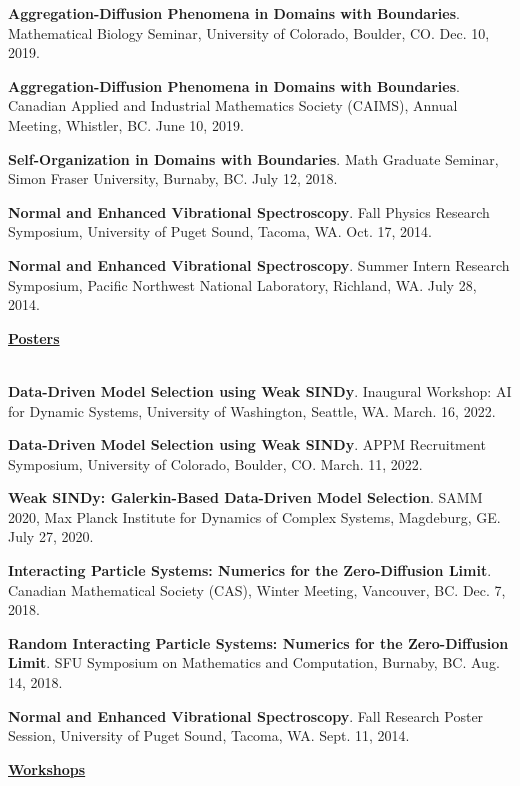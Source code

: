 \documentclass[letterpaper,11pt,oneside]{article}
\newcommand{\headr}[1]{\vspace{10pt}\uline{\Large{\textbf{#1}} \hfill } \\ \vspace{-10pt}\\}
\begin{document}
\begin{enumerate}[label={[\arabic*]}]
\item \textbf{Aggregation-Diffusion Phenomena in Domains with Boundaries}. Mathematical Biology Seminar, University of Colorado, Boulder, CO. Dec. 10, 2019.
\item \textbf{Aggregation-Diffusion Phenomena in Domains with Boundaries}. Canadian Applied and Industrial Mathematics Society (CAIMS), Annual Meeting, Whistler, BC. June 10, 2019.
\item \textbf{Self-Organization in Domains with Boundaries}. Math Graduate Seminar, Simon Fraser University, Burnaby, BC. July 12, 2018.
\item \textbf{Normal and Enhanced Vibrational Spectroscopy}. Fall Physics Research Symposium, University of Puget Sound, Tacoma, WA. Oct. 17, 2014.
\item \textbf{Normal and Enhanced Vibrational Spectroscopy}. Summer Intern Research Symposium, Pacific Northwest National Laboratory, Richland, WA. July 28, 2014.
\end{enumerate}

\headr{Posters} 
\begin{enumerate}[label={[\arabic*]}]
\item \textbf{Data-Driven Model Selection using Weak SINDy}. Inaugural Workshop: AI for Dynamic Systems, University of Washington, Seattle, WA. March. 16, 2022.
\item \textbf{Data-Driven Model Selection using Weak SINDy}. APPM Recruitment Symposium, University of Colorado, Boulder, CO. March. 11, 2022.
\item \textbf{Weak SINDy: Galerkin-Based Data-Driven Model Selection}. SAMM 2020, Max Planck Institute for Dynamics of Complex Systems, Magdeburg, GE. July 27, 2020.
\item \textbf{Interacting Particle Systems: Numerics for the Zero-Diffusion Limit}. Canadian Mathematical Society (CAS), Winter Meeting, Vancouver, BC. Dec. 7, 2018.
\item \textbf{Random Interacting Particle Systems: Numerics for the Zero-Diffusion Limit}. SFU Symposium on Mathematics and Computation, Burnaby, BC. Aug. 14, 2018.
\item \textbf{Normal and Enhanced Vibrational Spectroscopy}. Fall Research Poster Session, University of Puget Sound, Tacoma, WA. Sept. 11, 2014.
\end{enumerate}

\headr{Workshops}
\end{document}
